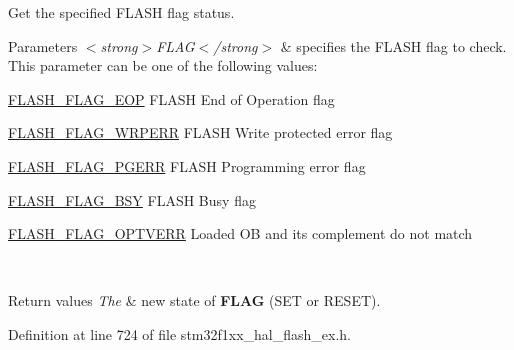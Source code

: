 Get the specified F\+L\+A\+SH flag status. 


\begin{DoxyParams}{Parameters}
{\em $<$strong$>$\+F\+L\+A\+G$<$/strong$>$} & specifies the F\+L\+A\+SH flag to check. This parameter can be one of the following values\+: \begin{DoxyItemize}
\item \hyperlink{group___f_l_a_s_h___flag__definition_gaf043ba4d8f837350bfc7754a99fae5a9}{F\+L\+A\+S\+H\+\_\+\+F\+L\+A\+G\+\_\+\+E\+OP} F\+L\+A\+SH End of Operation flag \item \hyperlink{group___f_l_a_s_h___flag__definition_ga6abf64f916992585899369166db3f266}{F\+L\+A\+S\+H\+\_\+\+F\+L\+A\+G\+\_\+\+W\+R\+P\+E\+RR} F\+L\+A\+SH Write protected error flag \item \hyperlink{group___f_l_a_s_h___flag__definition_gae2ef62dee0a5ca01e6226746039b6f20}{F\+L\+A\+S\+H\+\_\+\+F\+L\+A\+G\+\_\+\+P\+G\+E\+RR} F\+L\+A\+SH Programming error flag \item \hyperlink{group___f_l_a_s_h___flag__definition_gad3bc368f954ad7744deda3315da2fff7}{F\+L\+A\+S\+H\+\_\+\+F\+L\+A\+G\+\_\+\+B\+SY} F\+L\+A\+SH Busy flag \item \hyperlink{group___f_l_a_s_h___flag__definition_gacb2c4c991a260c3f110cd8c72f302864}{F\+L\+A\+S\+H\+\_\+\+F\+L\+A\+G\+\_\+\+O\+P\+T\+V\+E\+RR} Loaded OB and its complement do not match \end{DoxyItemize}
\\
\hline
\end{DoxyParams}

\begin{DoxyRetVals}{Return values}
{\em The} & new state of {\bfseries F\+L\+AG} (S\+ET or R\+E\+S\+ET). \\
\hline
\end{DoxyRetVals}


Definition at line 724 of file stm32f1xx\+\_\+hal\+\_\+flash\+\_\+ex.\+h.

